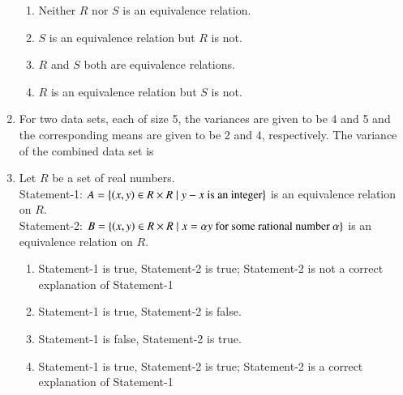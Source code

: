 \documentclass[journal,12pt,twocolumn]{IEEEtran}
\theoremstyle{remark}
\begin{document}
\begin{enumerate}
    \hfill{}
    \begin{enumerate}[label=(\alph*)]
        \item Neither $R$ nor $S$ is an equivalence relation.
        \item $S$ is an equivalence relation but $R$ is not.
        \item $R$ and $S$ both are equivalence relations.
        \item $R$ is an equivalence relation but $S$ is not.
    \end{enumerate}
    
    \item For two data sets, each of size 5, the variances are given to be 4 and 5 and the corresponding means are given to be 2 and 4, respectively. The variance of the combined data set is
    
    \hfill{}
    \begin{enumerate}[label=(\alph*)]
    \end{enumerate}
    
    \item Let $R$ be a set of real numbers. \\
    Statement-1: $A = \left\{\left(x, y\right) \in R \times R \mid y - x \text{ is an integer}\right\}$ is an equivalence relation on $R$. \\
    Statement-2: $B = \left\{\left(x, y\right) \in R \times R \mid x = \alpha y \text{ for some rational number } \alpha \right\}$ is an equivalence relation on $R$.

    \hfill{}
    \begin{enumerate}[label=(\alph*)]
        \item Statement-1 is true, Statement-2 is true; Statement-2 is not a correct explanation of Statement-1
        \item Statement-1 is true, Statement-2 is false.
        \item Statement-1 is false, Statement-2 is true.
        \item Statement-1 is true, Statement-2 is true; Statement-2 is a correct explanation of Statement-1
    \end{enumerate}
    

\end{enumerate}
\end{document}
